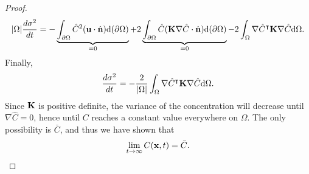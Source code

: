 \begin{proof}
\begin{equation}
	 		|\Omega|\frac{d\sigma^2}{dt} = - \underbrace{\int_{\partial \Omega} \hat C^2 (\mathbf u \cdot \hat{\mathbf n}) \mathrm d(\partial \Omega)}_{=0} + 2\underbrace{\int_{\partial \Omega} \hat C (\mathbf K \nabla \hat C \cdot \hat{\mathbf n}) \mathrm d(\partial \Omega)}_{=0} -2 \int_{\Omega} \nabla \hat C^\intercal \mathbf K \nabla \hat C \mathrm d\Omega.
	 \end{equation}
	 Finally,
	 \begin{equation}
	 	\frac{d\sigma^2}{dt} = -\frac{2}{|\Omega|} \int_{\Omega} \nabla \hat C^\intercal \mathbf K \nabla \hat C \mathrm d\Omega.
	 \end{equation}
	 Since $\mathbf K$ is positive definite, the variance of the concentration will decrease until $\nabla \hat C = 0$, hence until $C$ reaches a constant value everywhere on $\Omega$. The only possibility is $\bar C$, and thus we have shown that
	 \begin{equation}
	 	\lim_{t\rightarrow \infty} C(\mathbf x,t) = \bar C.
	 \end{equation}
\end{proof}